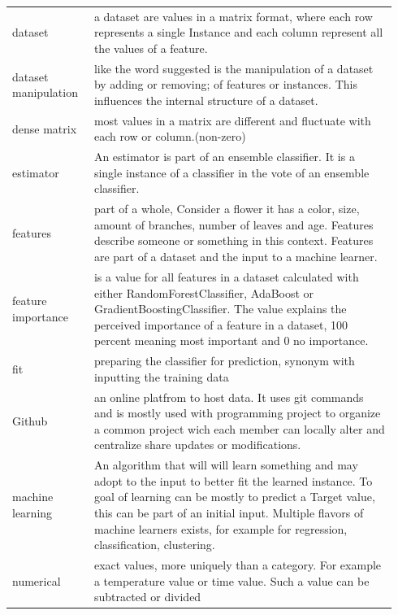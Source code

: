 \documentclass[a4paper,10pt]{article}
\begin{document}
\begin{tabular}{ p{0.20\linewidth} p{0.7437\linewidth} }
	dataset & a dataset are values in a matrix format, where each row represents a single Instance and each column represent all the values of a feature.\\ [1ex]
	
	dataset manipulation & like the word suggested is the manipulation of a dataset by adding or removing; of features or instances. This influences the internal structure of a dataset.  \\ [1ex]
	
	dense matrix & most values in a matrix are different and fluctuate with each row or column.(non-zero)\\ [1ex]
		
	estimator & An estimator is part of an ensemble classifier. It is a single instance of a classifier in the vote of an ensemble classifier.\\ [1ex]
	
	features & part of a whole, Consider a flower it has a color, size, amount of branches, number of leaves and age. Features describe someone or something in this context. Features are part of a dataset and the input to a machine learner.\\ [1ex]
	
	feature importance & is a value for all features in a dataset calculated with either RandomForestClassifier, AdaBoost or GradientBoostingClassifier. The value explains the perceived importance of a feature in a dataset, 100 percent meaning most important and 0 no importance.  \\ [1ex]
	
	fit & preparing the classifier for prediction, synonym with inputting the training data \\ [1ex]
	
	Github & an online platfrom to host data. It uses git commands and is mostly used with programming project to organize a common project wich each member can locally alter and centralize share updates or modifications. \\ [1ex]	
	
	machine learning & An algorithm that will will learn something and may adopt to the input to better fit the learned instance. To goal of learning can be mostly to predict a Target value, this can be part of an initial input. Multiple flavors of machine learners exists, for example for regression, classification, clustering.\\ [1ex]	
	
	numerical & exact values, more uniquely than a category. For example a temperature value or time value. Such a value can be subtracted or divided \\ [1ex]	
\end{tabular}
\end{document}

